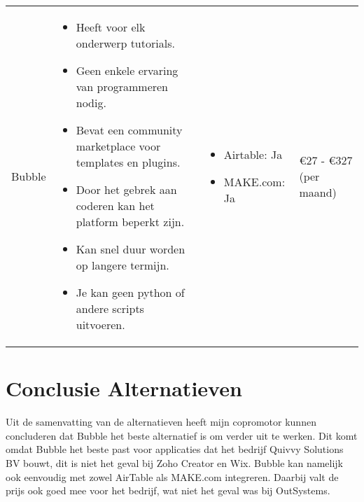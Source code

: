 \begin{longtable}{p{2.5cm} p{5.5cm} p{3.5cm} p{2.5cm}}
    Bubble & 
    \vspace{-\topsep}\vspace{-\partopsep} 
    \begin{itemize}[leftmargin=2pt, topsep=0pt,parsep=0pt,noitemsep]
        \item[] Heeft voor elk onderwerp tutorials.
        \item[] Geen enkele ervaring van programmeren nodig.
        \item[] Bevat een community marketplace voor templates en plugins.
    \end{itemize}
    \begin{itemize}[leftmargin=2pt, topsep=8pt,parsep=0pt,noitemsep]
        \item[] Door het gebrek aan coderen kan het platform beperkt zijn.
        \item[] Kan snel duur worden op langere termijn.
        \item[] Je kan geen python of andere scripts uitvoeren.
    \end{itemize} &
    \vspace{-\topsep}\vspace{-\partopsep} 
    \begin{itemize}[leftmargin=2pt, topsep=0pt,parsep=0pt,noitemsep]
        \item[]  Airtable: Ja
        \item[]  MAKE.com: Ja
    \end{itemize}
    &
    €27 - €327 (per maand)\\
\end{longtable}
\section{Conclusie Alternatieven}%
\label{sec:conclusie-alternatieven}
Uit de samenvatting van de alternatieven heeft mijn copromotor kunnen concluderen dat Bubble het beste alternatief is om verder uit te werken.
Dit komt omdat Bubble het beste past voor applicaties dat het bedrijf Quivvy Solutions BV bouwt, dit is niet het geval bij Zoho Creator en Wix. 
Bubble kan namelijk ook eenvoudig met zowel AirTable als MAKE.com integreren. Daarbij valt de prijs ook goed mee voor het bedrijf, wat niet het geval was bij OutSystems.
